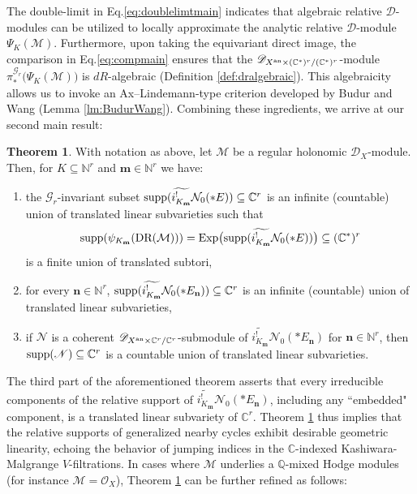 \documentclass{amsart}
\theoremstyle{plain}
\numberwithin{theorem}{section}
\theoremstyle{definition}
\theoremstyle{remark}
\theoremstyle{definition}
\newtheorem{mainthm}{Theorem}
\newcommand{\wt}{\widetilde}
\newcommand{\C}{\mathbb{C}} %
\newcommand{\N}{\mathbb{N}}
\newcommand{\Q}{\mathbb{Q}}
\newcommand{\cM}{\mathcal{M}}
\newcommand{\cN}{\mathcal{N}}
\newcommand{\cO}{\mathscr{O}}
\newcommand{\bn}{\mathbf{n}}
\newcommand{\bm}{\mathbf{m}}
\newcommand{\sN}{\mathscr{N}}
\newcommand{\sG}{\mathscr{G}}
\newcommand{\shD}{\mathscr{D}}
\newcommand{\DR}{\textup{DR}}
\newcommand{\an}{\textup{an}}
\newcommand{\supp}{\textup{supp}}
\begin{document}
The double-limit in Eq.\eqref{eq:doublelimtmain} indicates that algebraic relative  $\shD$-modules can be utilized to locally approximate the analytic relative $\shD$-module $\Psi_K(\cM)$. Furthermore, upon taking the equivariant direct image, the comparison in
Eq.\eqref{eq:compmain} ensures that
the $\shD_{X^{\an}\times (\C^*)^r/(\C^*)^r}$-module $\pi_*^{\sG_r}\big(\Psi_K(\cM)\big)$ is $dR$-algebraic (Definition \ref{def:dralgebraic}). This algebraicity allows us to invoke an Ax–Lindemann-type criterion developed by Budur and Wang 
(Lemma \ref{lm:BudurWang}). Combining these ingredients, we arrive at our second main result:
\begin{mainthm}\label{thm:mainC}
With notation as above, let $\cM$ be a regular holonomic $\shD_X$-module. Then, for $K\subseteq \N^r$ and $\bm\in \N^r$ we have:
    \begin{enumerate}[label=$(\arabic*)$]
        \item the $\sG_r$-invariant subset $\supp(\wt{i^!_{K_\bm}}\cN_0(*E))\subseteq\C^r$ is an infinite (countable) union of translated linear subvarieties such that 
        \[\supp(\psi_{K_\bm}(\DR(\cM)))=\textup{Exp}\big(\supp(\wt{i^!_{K_\bm}}\cN_0(*E))\big)\subseteq (\C^*)^r\]
        is a finite union of translated subtori,  
        \item for every $\bn\in \N^r$, $\supp(\wt{i^!_{K_\bm}}\cN_0(*E_\bn))\subseteq\C^r$ is an infinite (countable) union of translated linear subvarieties,
        \item if $\sN$ is a coherent $\shD_{X^\an\times \C^r/\C^r}$-submodule of $\wt{i^!_{K_\bm}}\cN_0(*E_\bn)$ for $\bn\in \N^r$, then  $\supp(\sN)\subseteq \C^r$ is a countable union of translated linear subvarieties.
    \end{enumerate}
\end{mainthm}
The third part of the aforementioned theorem asserts that every irreducible components of the relative support of $\wt{i^!_{K_\bm}}\cN_0(*E_\bn)$, including any ``embedded" component, is a translated linear subvariety of $\C^r$. Theorem \ref{thm:mainC} thus implies that the relative supports of generalized nearby cycles exhibit desirable geometric linearity, echoing the behavior of jumping indices in the $\C$-indexed Kashiwara-Malgrange $V$-filtrations. In cases where $\cM$ underlies a $\Q$-mixed Hodge modules (for instance $\cM=\cO_X$), Theorem \ref{thm:mainC} can be further refined as follows:
\end{document}
